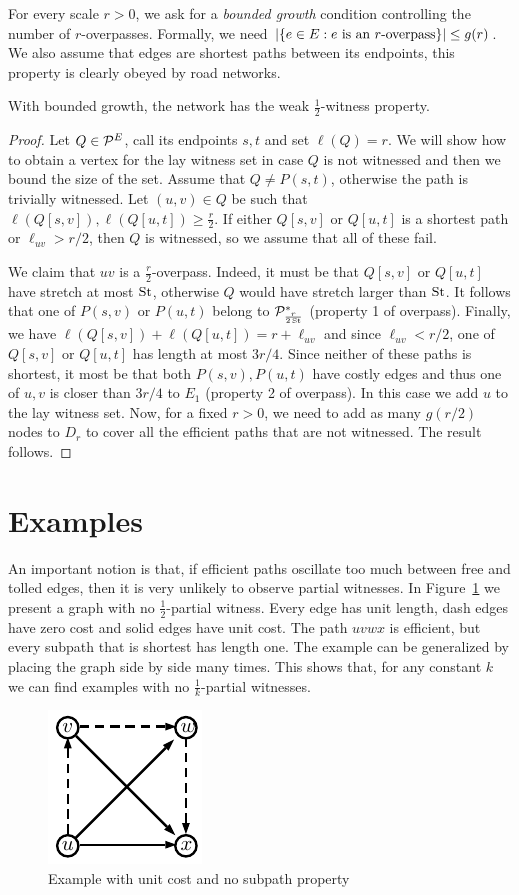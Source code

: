 \documentclass[letterpaper,11pt]{article}
\begin{document}
For every scale $r>0$, we ask for a \emph{bounded growth} condition controlling the number of $r$-overpasses.
Formally, we need $\lvert\{e\in E: e \text{ is an $r$-overpass}\}\rvert\leq g(r)$.
We also assume that edges are shortest paths between its endpoints, this property is clearly obeyed by road networks.

\begin{proposition}
With bounded growth, the network has the weak $\frac{1}{2}$-witness property.
\end{proposition}
\begin{proof}
Let $Q\in\mathcal{P}^E$, call its endpoints $s,t$ and set $\ell(Q)=r$.
We will show how to obtain a vertex for the lay witness set in case $Q$ is not witnessed and then we bound the size of the set.
Assume that $Q\neq P(s,t)$, otherwise the path is trivially witnessed.
Let $(u,v)\in Q$ be such that $\ell(Q[s,v]),\ell(Q[u,t])\geq \frac{r}{2}$. 
If either $Q[s,v]$ or $Q[u,t]$ is a shortest path or $\ell_{uv}>r/2$, then $Q$ is witnessed, so we assume that all of these fail.

We claim that $uv$ is a $\frac{r}{2}$-overpass.
Indeed, it must be that $Q[s,v]$ or $Q[u,t]$ have stretch at most $\operatorname{St}$, otherwise $Q$ would have stretch larger than $\operatorname{St}$.
It follows that one of $P(s,v)$ or $P(u,t)$ belong to $\mathcal{P}^*_{\frac{r}{2\operatorname{St}}}$ (property 1 of overpass).
Finally, we have $\ell(Q[s,v])+\ell(Q[u,t])=r+\ell_{uv}$ and since $\ell_{uv}<r/2$, one of $Q[s,v]$ or $Q[u,t]$ has length at most $3r/4$.
Since neither of these paths is shortest, it most be that both $P(s,v),P(u,t)$ have costly edges and thus one of $u,v$ is closer than $3r/4$ to $E_1$ (property 2 of overpass).
In this case we add $u$ to the lay witness set.
Now, for a fixed $r>0$, we need to add as many $g(r/2)$ nodes to $D_r$ to cover all the efficient paths that are not witnessed. 
The result follows.
\end{proof}

\section{Examples}

An important notion is that, if efficient paths oscillate too much between free and tolled edges, then it is very unlikely to observe partial witnesses.
In Figure~\ref{fig:nosubpath} we present a graph with no $\frac{1}{2}$-partial witness.
Every edge has unit length, dash edges have zero cost and solid edges have unit cost.
The path $uvwx$ is efficient, but every subpath that is shortest has length one.
The example can be generalized by placing the graph side by side many times.
This shows that, for any constant $k$ we can find examples with no $\frac{1}{k}$-partial witnesses.


\begin{figure}
\caption{Example with unit cost and no subpath property}
\label{fig:nosubpath}
\centering
\includegraphics[scale=1.3]{TexImg/Nosubpath.pdf}
\end{figure}



\end{document}
